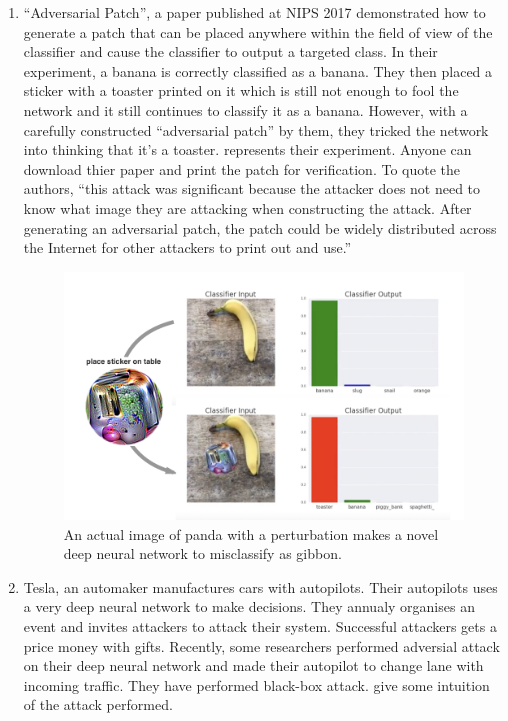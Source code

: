 \begin{enumerate}
        \item “Adversarial Patch”, a paper published at NIPS 2017 demonstrated how to generate a patch that can be placed anywhere within the field of view of the classifier and cause the classifier to output a targeted class. In their experiment, a banana is correctly classified as a banana. They then placed a sticker with a toaster printed on it which is still not enough to fool the network and it still continues to classify it as a banana. However, with a carefully constructed “adversarial patch” by them, they tricked the network into thinking that it’s a toaster.  represents their experiment. Anyone can download thier paper and print the patch for verification. To quote the authors, “this attack was significant because the attacker does not need to know what image they are attacking when constructing the attack. After generating an adversarial patch, the patch could be widely distributed across the Internet for other attackers to print out and use.”
        
            \begin{figure}[htbp]
                \centering
                    \includegraphics[width=0.7\linewidth]{images/example4.png}
                \caption{An actual image of panda with a perturbation makes a novel deep neural network to misclassify as gibbon.}
                \label{fig:example4}
            \end{figure}	
            
        \item Tesla, an automaker manufactures cars with autopilots. Their autopilots uses a very deep neural network to make decisions. They annualy organises an event and invites attackers to attack their system. Successful attackers gets a price money with gifts. Recently, some researchers performed adversial attack on their deep neural network and made their autopilot to change lane with incoming traffic. They have performed black-box attack.  give some intuition of the attack performed.
        

\end{enumerate}
